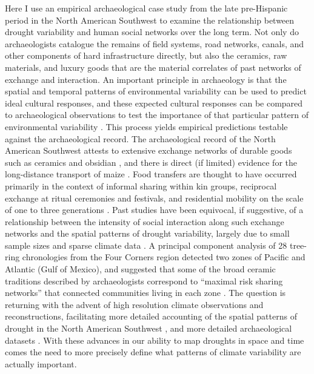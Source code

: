 \documentclass[10pt]{iopart}
\begin{document}
Here I use an empirical archaeological case study from the late pre-Hispanic period in the North American Southwest to examine the relationship between drought variability and human social networks over the long term. Not only do archaeologists catalogue the remains of field systems, road networks, canals, and other components of hard infrastructure directly, but also the ceramics, raw materials, and luxury goods that are the material correlates of past networks of exchange and interaction. An important principle in archaeology is that the spatial and temporal patterns of environmental variability can be used to predict ideal cultural responses, and these expected cultural responses can be compared to archaeological observations to test the importance of that particular pattern of environmental variability \parencite{Halstead1989}. This process yields empirical predictions testable against the archaeological record. The archaeological record of the North American Southwest attests to extensive exchange networks of durable goods such as ceramics and obsidian \parencite{Mills2013a}, and there is direct (if limited) evidence for the long-distance transport of maize \parencite{Benson2010, Benson2010WhoDrought}. Food transfers are thought to have occurred primarily in the context of informal sharing within kin groups, reciprocal exchange at ritual ceremonies and festivals, and residential mobility on the scale of one to three generations \parencite{Hegmon1991,Hegmon1996,Varien1999,Cordell2007,Spiemann1983}. Past studies have been equivocal, if suggestive, of a relationship between the intensity of social interaction along such exchange networks and the spatial patterns of drought variability, largely due to small sample sizes and sparse climate data \parencite{Rautman1993a,Johnson1990ChumashAnalysis}. A principal component analysis of 28 tree-ring chronologies from the Four Corners region detected two zones of Pacific and Atlantic (Gulf of Mexico), and suggested that some of the broad ceramic traditions described by archaeologists correspond to ``maximal risk sharing networks'' that connected communities living in each zone \parencite{Cordell2007}. The question is returning with the advent of high resolution climate observations and reconstructions, facilitating more detailed accounting of the spatial patterns of drought in the North American Southwest \parencite{Strawhacker2017RiskProvince}, and more detailed archaeological datasets \parencite{Borck2015}. With these advances in our ability to map droughts in space and time comes the need to more precisely define what patterns of climate variability are actually important.
\end{document}
